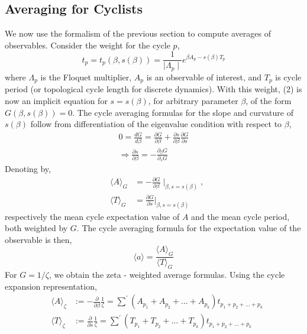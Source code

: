 \documentclass[twocolumn,aip,cha]{revtex4-1}
\begin{document}
\subsection{Averaging for Cyclists}
We now use the formalism of the previous section to compute averages of observables. Consider the weight for the cycle $p$,
\begin{equation}
t_{p} = t_{p}(\beta, s(\beta)) = \frac{1}{\mid \Lambda_{p} \mid} e^{\beta A_{p} - s(\beta)T_{p}}
\end{equation}
where $\Lambda_{p}$ is the Floquet multiplier, $A_{p}$ is an observable of interest, and $T_{p}$ is cycle period (or topological cycle length for discrete dynamics). With this weight, (2) is now an implicit equation for $s=s(\beta)$, for arbitrary parameter $\beta$, of the form $G(\beta, s(\beta)) = 0$. The cycle averaging formulas for the slope and curvature of $s(\beta)$ follow from differentiation of the eigenvalue condition with respect to $\beta$,
\begin{eqnarray*}
0 = \frac{d G}{d\beta} = \frac{\partial G}{\partial \beta} + \frac{\partial s}{\partial \beta}\frac{\partial G}{\partial s}
\\ \Rightarrow \frac{\partial s}{\partial \beta} = -\frac{\partial_{\beta}G}{\partial_{s} G}
\end{eqnarray*}
Denoting by,
\begin{eqnarray*}
&\langle A\rangle_{G}& = -\frac{\partial G}{\partial \beta}\mid_{\beta, s=s(\beta)},\\ &\langle T \rangle_{G}& = \frac{\partial G}{\partial s}\vert_{\beta, s=s(\beta)}
\end{eqnarray*}
respectively the mean cycle expectation value of $A$ and the mean cycle period, both weighted by $G$. The cycle averaging formula for the expectation value of the observable is then,
\begin{equation}
\langle a\rangle = \frac{\langle A \rangle_{G}}{\langle T \rangle_{G}}
\end{equation}
For $G = 1/\zeta$, we obtain the zeta - weighted average formulas. Using the cycle expansion representation,
\begin{eqnarray*}
&\langle A \rangle_{\zeta}&:=-\frac{\partial}{\partial \beta}\frac{1}{\zeta}=\sum^{'}(A_{p_{1}}+A_{p_{2}}+...+A_{p_{k}})t_{p_{1}+p_{2}+...+p_{k}} \\
&\langle T \rangle_{\zeta}&:=\frac{\partial}{\partial s}\frac{1}{\zeta}=\sum^{'}(T_{p_{1}}+T_{p_{2}}+...+T_{p_{k}})t_{p_{1}+p_{2}+...+p_{k}}
\end{eqnarray*}
\end{document}
